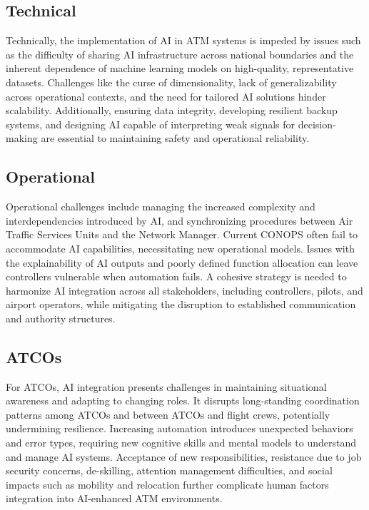 \subsection{Technical}

Technically, the implementation of \gls{AI} in \gls{ATM} systems is impeded by issues such as the difficulty of sharing \gls{AI} infrastructure across national boundaries and the inherent dependence of machine learning models on high-quality, representative datasets. 
Challenges like the curse of dimensionality, lack of generalizability across operational contexts, and the need for tailored \gls{AI} solutions hinder scalability. 
Additionally, ensuring data integrity, developing resilient backup systems, and designing \gls{AI} capable of interpreting weak signals for decision-making are essential to maintaining safety and operational reliability.

\subsection{Operational}

Operational challenges include managing the increased complexity and interdependencies introduced by \gls{AI}, and synchronizing procedures between Air Traffic Services Units and the Network Manager. 
Current \gls{CONOPS} often fail to accommodate \gls{AI} capabilities, necessitating new operational models. 
Issues with the explainability of AI outputs and poorly defined function allocation can leave controllers vulnerable when automation fails. 
A cohesive strategy is needed to harmonize AI integration across all stakeholders, including controllers, pilots, and airport operators, while mitigating the disruption to established communication and authority structures.

\subsection{ATCOs}

For \glspl{ATCO}, \gls{AI} integration presents challenges in maintaining situational awareness and adapting to changing roles. 
It disrupts long-standing coordination patterns among \glspl{ATCO} and between \glspl{ATCO} and flight crews, potentially undermining resilience. 
Increasing automation introduces unexpected behaviors and error types, requiring new cognitive skills and mental models to understand and manage \gls{AI} systems. 
Acceptance of new responsibilities, resistance due to job security concerns, de-skilling, attention management difficulties, and social impacts such as mobility and relocation further complicate human factors integration into \gls{AI}-enhanced \gls{ATM} environments.